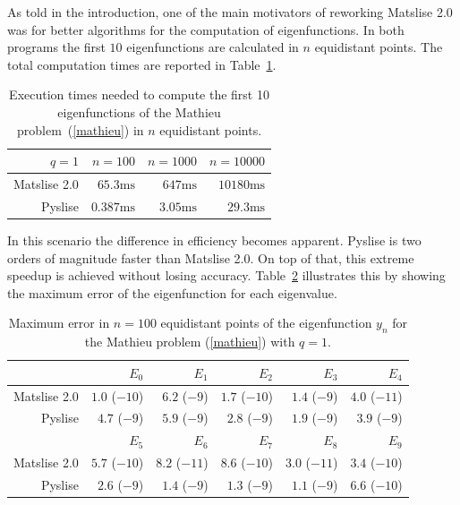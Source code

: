 As told in the introduction, one of the main motivators of reworking
Matslise 2.0 was for better algorithms for the computation of eigenfunctions. In both programs the first $10$ eigenfunctions are calculated in $n$ equidistant points. The total computation times are reported in Table~\ref{tab:c2_tab2}.

\begin{table}
  \begin{center}
    \begin{tabular}{rrrr}
      \toprule
      $q = 1$      & $n=100$          & $n=1000$        & $n=10000$        \\
      \midrule
      Matslise 2.0 & $65.3\text{ms}$  & $647\text{ms}$  & $10180\text{ms}$ \\
      Pyslise      & $0.387\text{ms}$ & $3.05\text{ms}$ & $29.3\text{ms}$  \\
      \bottomrule
    \end{tabular}
  \end{center}
  \caption{\label{tab:c2_tab2} Execution times needed to compute the first 10 eigenfunctions of the Mathieu problem~(\ref{mathieu}) in $n$ equidistant points.}
\end{table}

In this scenario the difference in efficiency becomes apparent. Pyslise is two orders of magnitude faster than Matslise 2.0. On top of that, this extreme speedup is achieved without losing accuracy. Table~\ref{tab:c2_tab3} illustrates this by showing the maximum error of the eigenfunction for each eigenvalue.

\begin{table}
  \begin{center}
    \begin{tabular}{rrrrrr}
      \toprule
                   & $E_{0}$       & $E_{1}$       & $E_{2}$       & $E_{3}$       & $E_{4}$       \\
      \midrule
      Matslise 2.0 & $1.0$ ($-10$) & $6.2$ ($-9$)  & $1.7$ ($-10$) & $1.4$ ($-9$)  & $4.0$ ($-11$) \\
      Pyslise      & $4.7$ ($-9$)  & $5.9$ ($-9$)  & $2.8$ ($-9$)  & $1.9$ ($-9$)  & $3.9$ ($-9$)  \\
      \midrule
      \midrule
                   & $E_{5}$       & $E_{6}$       & $E_{7}$       & $E_{8}$       & $E_{9}$       \\
      \midrule
      Matslise 2.0 & $5.7$ ($-10$) & $8.2$ ($-11$) & $8.6$ ($-10$) & $3.0$ ($-11$) & $3.4$ ($-10$) \\
      Pyslise      & $2.6$ ($-9$)  & $1.4$ ($-9$)  & $1.3$ ($-9$)  & $1.1$ ($-9$)  & $6.6$ ($-10$) \\
      \bottomrule
    \end{tabular}
  \end{center}
  \caption{\label{tab:c2_tab3} Maximum error in $n=100$ equidistant points of the eigenfunction $y_n$ for the Mathieu problem (\ref{mathieu}) with $q=1$.}
\end{table}

